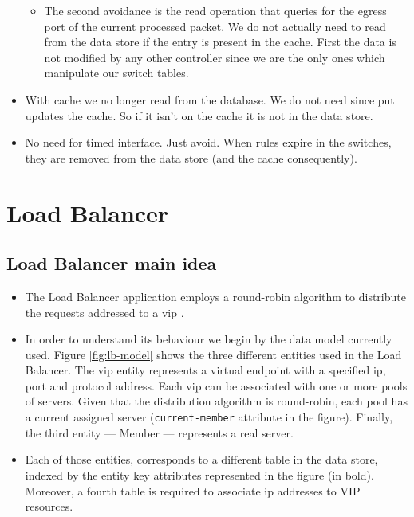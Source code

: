 \begin{itemize}
\begin{itemize}
\item The second avoidance is the read operation that queries for the egress
port of the current processed packet. We do not actually need to read
from the data store if the entry is present in the cache. First the
data is not modified by any other controller since we are the only
ones which manipulate our switch tables. 


\end{itemize}
\item With cache we no longer read from the database. We do not need since
put updates the cache. So if it isn't on the cache it is not in the
data store.

\item No need for timed interface. Just avoid. When rules expire in
  the switches, they are removed from the data store (and the cache
  consequently). 
\end{itemize}


\section{Load Balancer}
\label{sec:feasibility:lb}
\glsresetall

\subsection{Load Balancer main idea} 
\begin{itemize}
\item The Load Balancer application employs a round-robin algorithm to distribute the
requests addressed to a \gls{vip} . 

\item In order to
understand its behaviour we begin by the data model currently used. Figure
\ref{fig:lb-model} shows the three different entities used in the Load
Balancer. The \gls{vip} entity represents a virtual endpoint with a specified \gls{ip}, port and
protocol address. Each \gls{vip} can be associated with one or more pools of 
servers. Given that the distribution algorithm is round-robin, each pool
has a current assigned server (\texttt{current-member} attribute in the figure). Finally, the third entity --- Member
--- represents a real server. 
\item Each of those entities, corresponds
to a different  table  in the data store, indexed by the entity
key attributes represented in the figure (in bold). Moreover, a fourth table is
required to associate \gls{ip} addresses to VIP resources. 



\end{itemize}

